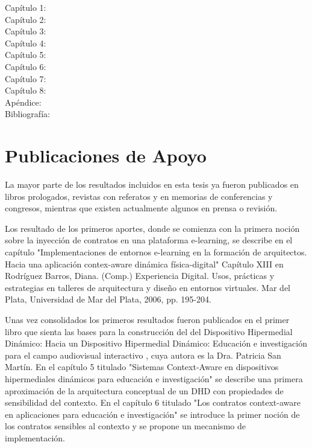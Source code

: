 {\begin{description}
 \item[Capítulo 1:]
 \item[Capítulo 2:]
 \item[Capítulo 3:]
 \item[Capítulo 4:]
 \item[Capítulo 5:]
 \item[Capítulo 6:]
 \item[Capítulo 7:]
 \item[Capítulo 8:]
 \item[Apéndice:]
 \item[Bibliografía:]
\end{description}


\section{Publicaciones de Apoyo}

La mayor parte de los resultados incluidos en esta tesis ya fueron publicados en
libros prologados, revistas con referatos y en memorias de conferencias y
congresos, mientras que existen actualmente algunos en prensa o revisión.


Los resultado de los primeros aportes, donde se comienza con la primera noción
sobre la inyección de contratos en una plataforma e-learning, se describe en
el capítulo "Implementaciones de entornos e-learning en la formación de
arquitectos. Hacia una aplicación contex-aware dinámica física-digital" Capítulo
XIII en Rodríguez Barros, Diana. (Comp.) Experiencia Digital. Usos, prácticas y
estrategias en talleres de arquitectura y diseño en entornos virtuales. Mar del
Plata, Universidad de Mar del Plata, 2006, pp. 195-204.

Unas vez consolidados los primeros resultados fueron publicados en el primer
libro que sienta las bases para la construcción del del Dispositivo Hipermedial
Dinámico: Hacia un Dispositivo Hipermedial Dinámico:
Educación e investigación para el campo audiovisual interactivo \cite{librounq},
cuya autora es la Dra. Patricia San Martín. En el capítulo 5 titulado "Sistemas
Context-Aware en dispositivos hipermediales dinámicos para educación e
investigación" se describe una primera aproximación de la arquitectura
conceptual de un DHD con propiedades de sensibilidad del contexto. En el
capítulo 6 titulado "Los contratos context-aware en aplicaciones para educación
e investigación" se introduce la primer noción de los contratos sensibles al
contexto y se propone un mecanismo de implementación. 

}
